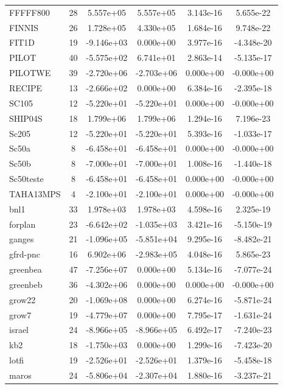 \documentclass[12pt,a4paper]{article}
\begin{document}
\begin{longtable}{@{}l|ccccc@{}}
FFFFF800 & 28 & 5.557e+05 & 5.557e+05 & 3.143e-16 & 5.655e-22 \\
FINNIS & 26 & 1.728e+05 & 4.330e+05 & 1.684e-16 & 9.748e-22 \\
FIT1D & 19 & -9.146e+03 & 0.000e+00 & 3.977e-16 & -4.348e-20 \\
PILOT & 40 & -5.575e+02 & 6.741e+01 & 2.863e-14 & -5.135e-17 \\
PILOTWE & 39 & -2.720e+06 & -2.703e+06 & 0.000e+00 & -0.000e+00 \\
RECIPE & 13 & -2.666e+02 & 0.000e+00 & 6.384e-16 & -2.395e-18 \\
SC105 & 12 & -5.220e+01 & -5.220e+01 & 0.000e+00 & -0.000e+00 \\
SHIP04S & 18 & 1.799e+06 & 1.799e+06 & 1.294e-16 & 7.196e-23 \\
Sc205 & 12 & -5.220e+01 & -5.220e+01 & 5.393e-16 & -1.033e-17 \\
Sc50a & 8 & -6.458e+01 & -6.458e+01 & 0.000e+00 & -0.000e+00 \\
Sc50b & 8 & -7.000e+01 & -7.000e+01 & 1.008e-16 & -1.440e-18 \\
Sc50teste & 8 & -6.458e+01 & -6.458e+01 & 0.000e+00 & -0.000e+00 \\
TAHA13MPS & 4 & -2.100e+01 & -2.100e+01 & 0.000e+00 & -0.000e+00 \\
bnl1 & 33 & 1.978e+03 & 1.978e+03 & 4.598e-16 & 2.325e-19 \\
forplan & 23 & -6.642e+02 & -1.035e+03 & 3.421e-16 & -5.150e-19 \\
ganges & 21 & -1.096e+05 & -5.851e+04 & 9.295e-16 & -8.482e-21 \\
gfrd-pnc & 16 & 6.902e+06 & -2.983e+05 & 4.048e-16 & 5.865e-23 \\
greenbea & 47 & -7.256e+07 & 0.000e+00 & 5.134e-16 & -7.077e-24 \\
greenbeb & 36 & -4.302e+06 & 0.000e+00 & 0.000e+00 & -0.000e+00 \\
grow22 & 20 & -1.069e+08 & 0.000e+00 & 6.274e-16 & -5.871e-24 \\
grow7 & 19 & -4.779e+07 & 0.000e+00 & 7.795e-17 & -1.631e-24 \\
israel & 24 & -8.966e+05 & -8.966e+05 & 6.492e-17 & -7.240e-23 \\
kb2 & 18 & -1.750e+03 & 0.000e+00 & 1.299e-16 & -7.423e-20 \\
lotfi & 19 & -2.526e+01 & -2.526e+01 & 1.379e-16 & -5.458e-18 \\
maros & 24 & -5.806e+04 & -2.307e+04 & 1.880e-16 & -3.237e-21 \\

\end{longtable}
\end{document}
